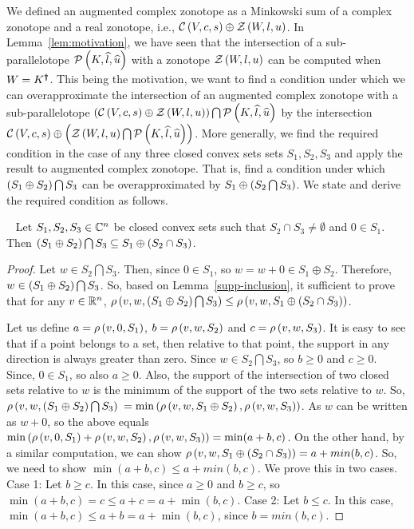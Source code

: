 We defined an augmented complex zonotope as a Minkowski sum of a
complex zonotope and a real zonotope, i.e.,
$\cz{V}{c}{s}\oplus\zon{W}{l}{u}$.  In Lemma~\ref{lem:motivation}, we
have seen that the intersection of a sub-parallelotope
$\sptope{K}{\wh{l}}{\wh{u}}$ with a zonotope $\zon{W}{l}{u}$ can be
computed when $W=\pinv{K}$.  This being the motivation, we want to
find a condition under which we can overapproximate the intersection
of an augmented complex zonotope with a sub-parallelotope
$\lt(\cz{V}{c}{s}\oplus\zon{W}{l}{u}\rt)\bigcap\sptope{K}{\wh{l}}{\wh{u}}$
by the intersection
$\cz{V}{c}{s}\oplus\lt(\zon{W}{l}{u}\bigcap\sptope{K}{\wh{l}}{\wh{u}}\rt)$.
More generally, we find the required condition in the case of any
three closed convex sets sets $S_1,S_2,S_3$ and apply the result to
augmented complex zonotope.  That is, find a condition under which
$\lt(S_1\oplus S_2\rt)\bigcap S_3$ can be overapproximated by
$S_1\oplus\lt(S_2\bigcap S_3\rt)$.  We state and derive the required
condition as follows.
%
\begin{lemma}~\label{gen-int}
Let $S_1,S_2,S_3\in\complexset^n$ be closed convex sets such that
$S_2\cap S_3\neq \emptyset$ and $0\in S_1$.  Then $\lt(S_1\oplus S_2\rt)\bigcap
S_3\subseteq S_1\oplus\lt(S_2\cap S_3\rt)$.
\end{lemma}
\begin{proof}
 Let $w\in S_2\bigcap S_3$.  Then, since $0\in S_1$, so $w=w+0\in
 S_1\oplus S_2$.  Therefore, $w\in \lt(S_1\oplus S_2\rt)\bigcap S_3$.
 So, based on Lemma~\ref{supp-inclusion}, it sufficient to prove that
 for any $v\in\realset^n$, $\support{w}{v}{\lt(S_1\oplus
   S_2\rt)\bigcap S_3}\leq \support{w}{v}{S_1\oplus\lt(S_2\cap
   S_3\rt)}$.

Let us define $a = \support{0}{v}{S_1}$, $b=\support{w}{v}{S_2}$ and
$c = \support{w}{v}{S_3}$.  It is easy to see that if a point belongs
to a set, then relative to that point, the support in any direction is
always greater than zero.  Since $w\in S_2\bigcap S_3$, so $b\geq 0$
and $c\geq 0$.  Since, $0\in S_1$, so also $a\geq 0$.  Also, the
support of the intersection of two closed sets relative to $w$ is the
minimum of the support of the two sets relative to $w$.  So,
$\support{w}{v}{\lt(S_1\oplus S_2\rt)\bigcap S_3}$ $=
\min\lt(\support{w}{v}{S_1\oplus S_2},\support{w}{v}{S_3}\rt)$.  As
$w$ can be written as $w+0$, so the above equals
$\min\lt(\support{0}{v}{S_1}+\support{w}{v}{S_2},\support{w}{v}{S_3}\rt)
= \min(a+b,c)$.  On the other hand, by a similar computation, we can
show $\support{w}{v}{S_1\oplus\lt(S_2\cap S_3\rt)} = a+min(b,c)$.  So,
we need to show $\min(a+b,c)\leq a+min(b,c)$.  We prove this in two
cases. Case 1: Let $b\geq c$.  In this case, since $a\geq 0$ and
$b\geq c$, so $\min(a+b,c) = c \leq a+c = a+\min(b,c)$.  Case 2: Let
$b\leq c$.  In this case, $\min(a+b,c)\leq a+b = a+\min(b,c)$, since
$b=min(b,c)$.
\end{proof}

